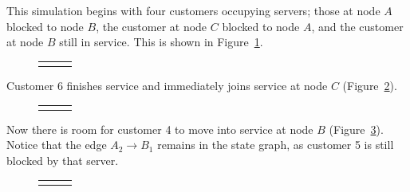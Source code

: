 \documentclass{article}
\begin{document}
This simulation begins with four customers occupying servers; those at node $A$ blocked to node $B$, the customer at node $C$ blocked to node $A$, and the customer at node $B$ still in service.
This is shown in Figure~\ref{fig:general_builddown_1}.

\begin{figure}[H]
  \begin{center}
    \begin{tabular}{ c c c }
       & \hspace{0.1\textwidth} &
       \\
  \end{tabular}
  \end{center}
  \caption{}
  \label{fig:general_builddown_1}
\end{figure}

Customer 6 finishes service and immediately joins service at node $C$ (Figure~\ref{fig:general_builddown_2}).

\begin{figure}[H]
  \begin{center}
    \begin{tabular}{ c c c }
       & \hspace{0.1\textwidth} &
       \\
  \end{tabular}
  \end{center}
  \caption{}
  \label{fig:general_builddown_2}
\end{figure}

Now there is room for customer 4 to move into service at node $B$ (Figure~\ref{fig:general_builddown_3}).
Notice that the edge $A_2 \longrightarrow B_1$ remains in the state graph, as customer 5 is still blocked by that server.

\begin{figure}[H]
  \begin{center}
    \begin{tabular}{ c c c }
       & \hspace{0.1\textwidth} &
       \\
  \end{tabular}
  \end{center}
  \caption{}
  \label{fig:general_builddown_3}
\end{figure}
\end{document}
